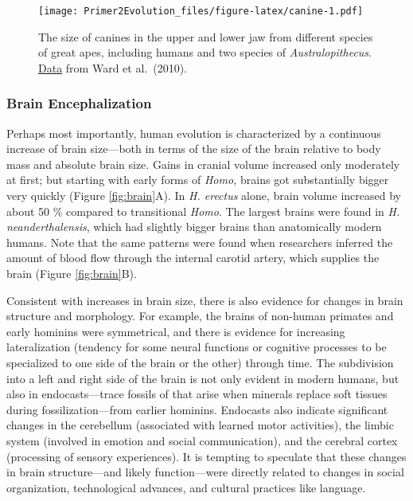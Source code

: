 \documentclass[
]{book}
\begin{document}
\begin{figure}
\centering
\texttt{[image: Primer2Evolution\_files/figure-latex/canine-1.pdf]}
\caption{\label{fig:canine}The size of canines in the upper and lower jaw from different species of great apes, including humans and two species of \emph{Australopithecus}. \href{data/14_canine_size.csv}{Data} from Ward et al.~(2010).}
\end{figure}

\hypertarget{brain-encephalization}{%
\subsubsection*{Brain Encephalization}\label{brain-encephalization}}

Perhaps most importantly, human evolution is characterized by a continuous increase of brain size---both in terms of the size of the brain relative to body mass and absolute brain size. Gains in cranial volume increased only moderately at first; but starting with early forms of \emph{Homo,} brains got substantially bigger very quickly (Figure \ref{fig:brain}A). In \emph{H. erectus} alone, brain volume increased by about 50 \% compared to transitional \emph{Homo}. The largest brains were found in \emph{H. neanderthalensis}, which had slightly bigger brains than anatomically modern humans. Note that the same patterns were found when researchers inferred the amount of blood flow through the internal carotid artery, which supplies the brain (Figure \ref{fig:brain}B).

Consistent with increases in brain size, there is also evidence for changes in brain structure and morphology. For example, the brains of non-human primates and early hominins were symmetrical, and there is evidence for increasing lateralization (tendency for some neural functions or cognitive processes to be specialized to one side of the brain or the other) through time. The subdivision into a left and right side of the brain is not only evident in modern humans, but also in endocasts---trace fossils of that arise when minerals replace soft tissues during fossilization---from earlier hominins. Endocasts also indicate significant changes in the cerebellum (associated with learned motor activities), the limbic system (involved in emotion and social communication), and the cerebral cortex (processing of sensory experiences). It is tempting to speculate that these changes in brain structure---and likely function---were directly related to changes in social organization, technological advances, and cultural practices like language.
\end{document}
